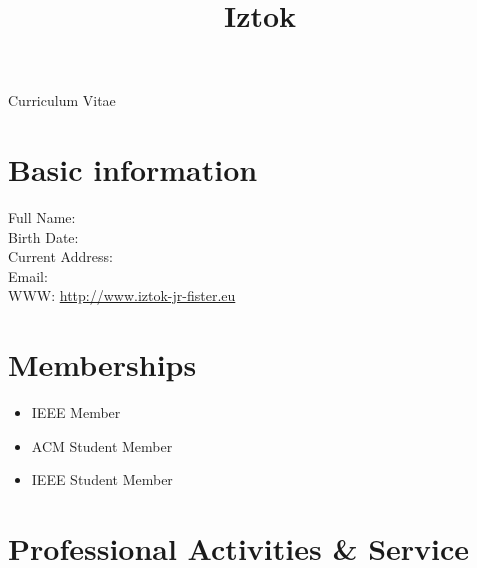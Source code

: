 \documentclass[blue]{iztok}
\title{Iztok}
\begin{document}
\onecolumn 

\maketitle
 
\noindent

\begin{center} Curriculum Vitae \end{center}

\section{Basic information}          
   Full Name: \\
   Birth Date: \\
   Current Address: \\ 
   Email:  \\
   WWW: \url{http://www.iztok-jr-fister.eu}
   

\section{Memberships}
\begin{itemize}
\item IEEE Member
\item ACM Student Member
\item IEEE Student Member
\end{itemize}

\section{Professional Activities \& Service}

\clearpage
\newpage

%
\end{document}
